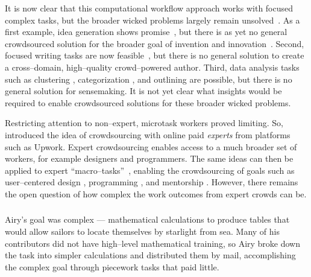 \documentclass[trackingWork]{subfiles}
\begin{document}
It is now clear that this computational workflow approach works with focused complex tasks, but
the broader wicked problems largely remain unsolved~\cite{rittel1973dilemmas}.
As a first example,
idea generation shows promise~\cite{YuEncouragingOutside,yu2014distributed,Yu2016a},
but there is as yet no general crowdsourced solution for
the broader goal of invention and innovation~\cite{fuge2014analysis}.
Second,
focused writing tasks are now feasible~\cite{Kim2017,bernsteinSoylent,Nebeling:2016:WCW:2858036.2858169,
      writingMicroTasks,agapie2015crowdsourcing}, but
there is no general solution to create
a cross--domain, high--quality crowd--powered author. 
Third,
data analysis tasks such as
clustering \cite{chilton2013cascade},
categorization \cite{andre2014crowd}, and
outlining \cite{luther2015crowdlines}
are possible, but there is no general solution for sensemaking.
It is not yet clear what insights would be required
to enable crowdsourced solutions for these broader wicked problems.

Restricting attention to non--expert, microtask workers proved limiting.
So, \citeauthor{foundry} introduced the idea of crowdsourcing with
online paid \textit{experts} from platforms such as Upwork.
Expert crowdsourcing enables access to a much broader set of workers,
for example designers and programmers.
The same ideas can then be applied to expert ``macro--tasks''~\cite{cheng2015break,haas2015argonaut}, enabling the crowdsourcing of goals such as user--centered design \cite{foundry},
programming \cite{latoza2014microtask,Fast2016,Chen2016}, and
mentorship \cite{suzukiAtelier}.
However, there remains the open question of
how complex the work outcomes from expert crowds can be.


\subsubsection{\pieceworkpers}

\begin{comment}
- Farm workers-->textile
- Limit: human management and oversight
- Evaluation
- Skilled work harder
- Only some organizations can use it
- Management practices
\end{comment}

Airy's goal was complex
--- mathematical calculations to produce tables that would
allow sailors to locate themselves by starlight from sea.
Many of his contributors did not have high--level mathematical training,
so Airy broke down the task into simpler calculations and
distributed them by mail,
accomplishing the complex goal through piecework tasks that paid little.
\end{document}

